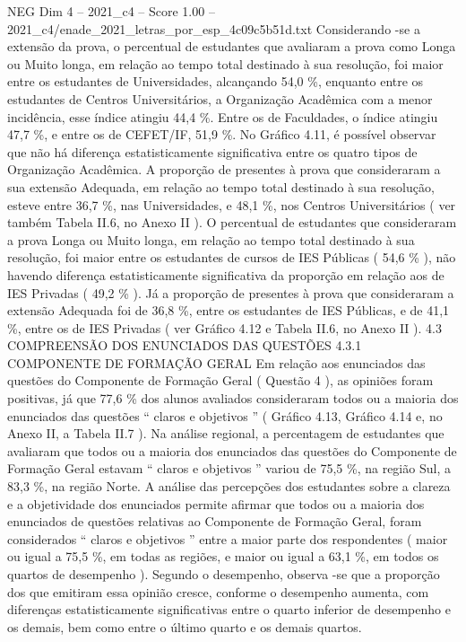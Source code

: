 \begin{textsample}{NEG Dim 4 – 2021\_c4 – Score 1.00 – 2021\_c4/enade\_2021\_letras\_por\_esp\_4c09c5b51d.txt}
Considerando -se a extensão da prova, o percentual de estudantes que avaliaram a prova como Longa ou Muito longa, em relação ao tempo total destinado à sua resolução, foi maior entre os estudantes de Universidades, alcançando 54,0 \%, enquanto entre os estudantes de Centros Universitários, a Organização Acadêmica com a menor incidência, esse índice atingiu 44,4 \%.
Entre os de Faculdades, o índice atingiu 47,7 \%, e entre os de CEFET/IF, 51,9 \%.
No Gráfico 4.11, é possível observar que não há diferença estatisticamente significativa entre os quatro tipos de Organização Acadêmica.
A proporção de presentes à prova que consideraram a sua extensão Adequada, em relação ao tempo total destinado à sua resolução, esteve entre 36,7 \%, nas Universidades, e 48,1 \%, nos Centros Universitários ( ver também Tabela II.6, no Anexo II ).
O percentual de estudantes que consideraram a prova Longa ou Muito longa, em relação ao tempo total destinado à sua resolução, foi maior entre os estudantes de cursos de IES Públicas ( 54,6 \% ), não havendo diferença estatisticamente significativa da proporção em relação aos de IES Privadas ( 49,2 \% ).
Já a proporção de presentes à prova que consideraram a extensão Adequada foi de 36,8 \%, entre os estudantes de IES Públicas, e de 41,1 \%, entre os de IES Privadas ( ver Gráfico 4.12 e Tabela II.6, no Anexo II ). 4.3 COMPREENSÃO DOS ENUNCIADOS DAS QUESTÕES 4.3.1 COMPONENTE DE FORMAÇÃO GERAL Em relação aos enunciados das questões do Componente de Formação Geral ( Questão 4 ), as opiniões foram positivas, já que 77,6 \% dos alunos avaliados consideraram todos ou a maioria dos enunciados das questões “ claros e objetivos ” ( Gráfico 4.13, Gráfico 4.14 e, no Anexo II, a Tabela II.7 ).
Na análise regional, a percentagem de estudantes que avaliaram que todos ou a maioria dos enunciados das questões do Componente de Formação Geral estavam “ claros e objetivos ” variou de 75,5 \%, na região Sul, a 83,3 \%, na região Norte.
A análise das percepções dos estudantes sobre a clareza e a objetividade dos enunciados permite afirmar que todos ou a maioria dos enunciados de questões relativas ao Componente de Formação Geral, foram considerados “ claros e objetivos ” entre a maior parte dos respondentes ( maior ou igual a 75,5 \%, em todas as regiões, e maior ou igual a 63,1 \%, em todos os quartos de desempenho ).
Segundo o desempenho, observa -se que a proporção dos que emitiram essa opinião cresce, conforme o desempenho aumenta, com diferenças estatisticamente significativas entre o quarto inferior de desempenho e os demais, bem como entre o último quarto e os demais quartos.

\end{textsample}

